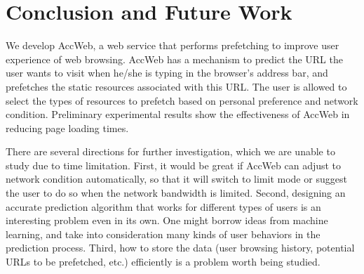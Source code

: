 \section{Conclusion and Future Work}
\label{sec:conclusion}

We develop AccWeb, a web service that performs prefetching to improve user experience of web browsing. AccWeb has a mechanism to predict the URL the user wants to visit when he/she is typing in the browser's address bar, and prefetches the static resources associated with this URL. The user is allowed to select the types of resources to prefetch based on personal preference and network condition. Preliminary experimental results show the effectiveness of AccWeb in reducing page loading times.


There are several directions for further investigation, which we are unable to study due to time limitation.
First, it would be great if AccWeb can adjust to network condition automatically, so that it will switch to limit mode or suggest the user to do so when the network bandwidth is limited.
Second, designing an accurate prediction algorithm that works for different types of users is an interesting problem even in its own. One might borrow ideas from machine learning, and take into consideration many kinds of user behaviors in the prediction process.
Third, how to store the data (user browsing history, potential URLs to be prefetched, etc.) efficiently is a problem worth being studied.

